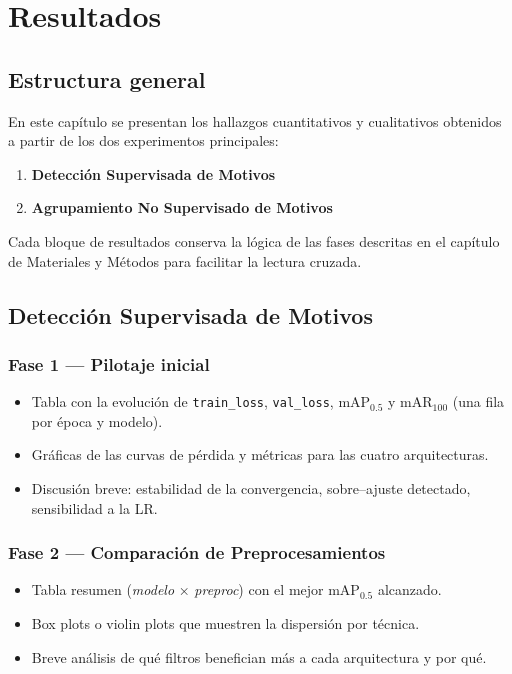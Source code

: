 \chapter{Resultados}\label{ch:resultados}

\section{Estructura general}
En este capítulo se presentan los hallazgos cuantitativos y cualitativos obtenidos a partir de los dos experimentos principales:

\begin{enumerate}
  \item \textbf{Detección Supervisada de Motivos}
  \item \textbf{Agrupamiento No Supervisado de Motivos}
\end{enumerate}

Cada bloque de resultados conserva la lógica de las fases descritas en el capítulo de Materiales y Métodos para facilitar la lectura cruzada.

\section{Detección Supervisada de Motivos}

\subsection{Fase 1 — Pilotaje inicial}
\begin{itemize}
  \item Tabla con la evolución de \texttt{train\_loss}, \texttt{val\_loss}, mAP$_{0.5}$ y mAR$_{100}$ (una fila por época y modelo).
  \item Gráficas de las curvas de pérdida y métricas para las cuatro arquitecturas.
  \item Discusión breve: estabilidad de la convergencia, sobre–ajuste detectado, sensibilidad a la LR.
\end{itemize}

\subsection{Fase 2 — Comparación de Preprocesamientos}
\begin{itemize}
  \item Tabla resumen (\textit{modelo} × \textit{preproc}) con el mejor mAP$_{0.5}$ alcanzado.
  \item Box plots o violin plots que muestren la dispersión por técnica.
  \item Breve análisis de qué filtros benefician más a cada arquitectura y por qué.
\end{itemize}

